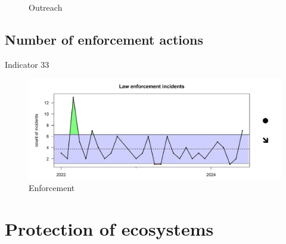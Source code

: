 \documentclass[
  letterpaper,
  oneside,
  open=any]{scrbook}
\begin{document}
\begin{figure}


\caption{\label{fig-outreach}Outreach}

\end{figure}%

\subsection{Number of enforcement
actions}\label{number-of-enforcement-actions}

Indicator 33

\begin{figure}[H]

{\centering \includegraphics{indicator_plots/enforcement_plot_final.png}

}

\caption{Enforcement}

\end{figure}%

\section{Protection of ecosystems}\label{protection-of-ecosystems}
\end{document}
